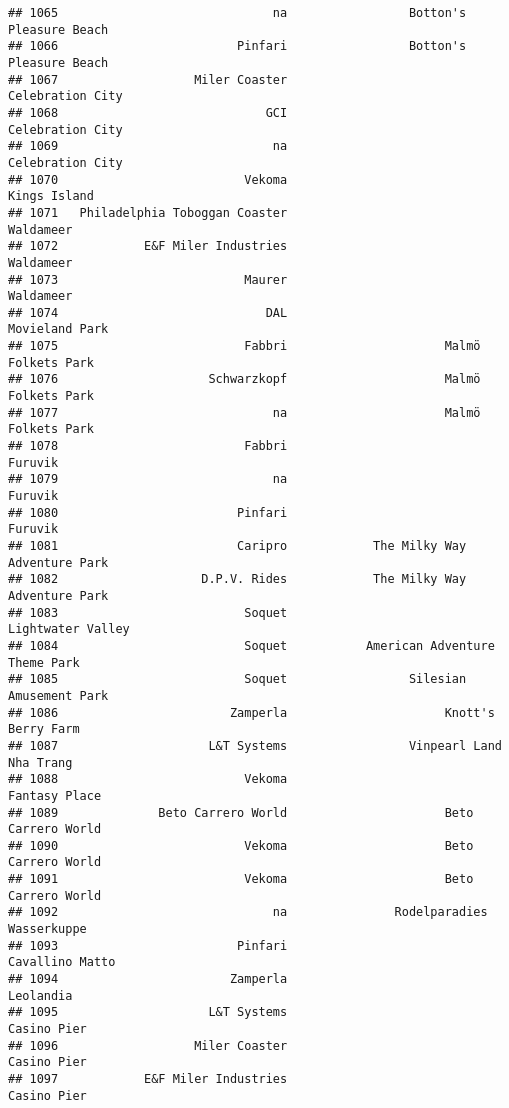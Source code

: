 \documentclass[
]{article}
\begin{document}
\begin{verbatim}
## 1065                              na                 Botton's Pleasure Beach
## 1066                         Pinfari                 Botton's Pleasure Beach
## 1067                   Miler Coaster                        Celebration City
## 1068                             GCI                        Celebration City
## 1069                              na                        Celebration City
## 1070                          Vekoma                            Kings Island
## 1071   Philadelphia Toboggan Coaster                               Waldameer
## 1072            E&F Miler Industries                               Waldameer
## 1073                          Maurer                               Waldameer
## 1074                             DAL                          Movieland Park
## 1075                          Fabbri                      Malmö Folkets Park
## 1076                     Schwarzkopf                      Malmö Folkets Park
## 1077                              na                      Malmö Folkets Park
## 1078                          Fabbri                                 Furuvik
## 1079                              na                                 Furuvik
## 1080                         Pinfari                                 Furuvik
## 1081                         Caripro            The Milky Way Adventure Park
## 1082                    D.P.V. Rides            The Milky Way Adventure Park
## 1083                          Soquet                       Lightwater Valley
## 1084                          Soquet           American Adventure Theme Park
## 1085                          Soquet                 Silesian Amusement Park
## 1086                        Zamperla                      Knott's Berry Farm
## 1087                     L&T Systems                 Vinpearl Land Nha Trang
## 1088                          Vekoma                           Fantasy Place
## 1089              Beto Carrero World                      Beto Carrero World
## 1090                          Vekoma                      Beto Carrero World
## 1091                          Vekoma                      Beto Carrero World
## 1092                              na               Rodelparadies Wasserkuppe
## 1093                         Pinfari                         Cavallino Matto
## 1094                        Zamperla                               Leolandia
## 1095                     L&T Systems                             Casino Pier
## 1096                   Miler Coaster                             Casino Pier
## 1097            E&F Miler Industries                             Casino Pier

\end{verbatim}
\end{document}
